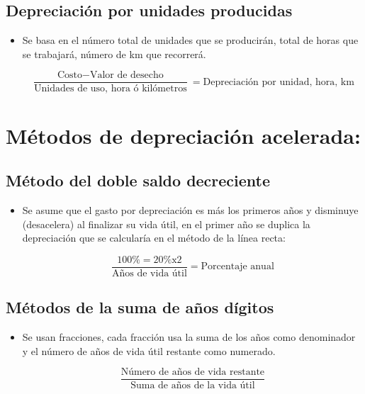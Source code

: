 \documentclass{article}
\begin{document}
\subsection{Depreciación por unidades producidas}
\begin{itemize}
    \item Se basa en el número total de unidades que se producirán, total de horas que se trabajará, número de km que recorrerá.
        \begin{center}
            \[
                \frac{\text{Costo} - \text{Valor de desecho}}{\text{Unidades de uso, hora ó kilómetros}} = \text{Depreciación por unidad, hora, km} 
              \]
        \end{center}
\end{itemize}

\section{Métodos de depreciación acelerada:}
\subsection{Método del doble saldo decreciente}
\begin{itemize}
    \item Se asume que el gasto por depreciación es más los primeros años y disminuye (desacelera) al finalizar su vida útil, en el primer año se duplica la depreciación que se calcularía en el método de la línea recta:
        \begin{center}
           \[
             \frac{100\% = 20\% \text{x} 2 }{\text{Años de vida útil}} = \text{Porcentaje anual}
           \]
        \end{center}
\end{itemize}
\subsection{Métodos de la suma de años dígitos}
\begin{itemize}
    \item Se usan fracciones, cada fracción usa la suma de los años como denominador y el número de años de vida útil restante como numerado.
        \begin{center}
           \[
             \frac{\text{Número de años de vida restante}}{\text{Suma de años de la vida útil}}
           \]
        \end{center}
\end{itemize}
\end{document}
